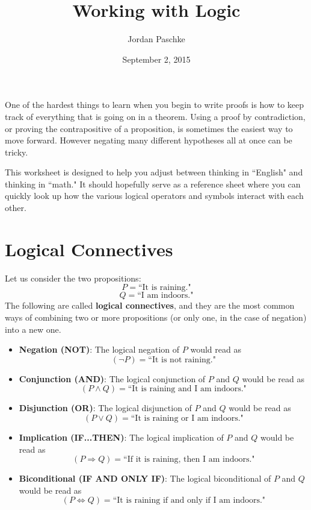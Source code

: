 \documentclass[12pt]{article}
\title{Working with Logic}
\author{Jordan Paschke}
\date{September 2, 2015}
\renewcommand{\_}[1]{\underline{ #1 }}
\theoremstyle{definition}
\numberwithin{equation}{subsection}
\begin{document}
\maketitle


One of the hardest things to learn when you begin to write proofs is how to keep track of everything that is going on in a theorem. Using a proof by contradiction, or proving the contrapositive of a proposition, is sometimes the easiest way to move forward. However negating many different hypotheses all at once can be tricky.

\bigskip

This worksheet is designed to help you adjust between thinking in ``English" and thinking in ``math." It should hopefully serve as a reference sheet where you can quickly look up how the various logical operators and symbols interact with each other.

\section*{Logical Connectives}

Let us consider the two propositions:
\[
P = \text{``It is raining."}
\]
\[
Q = \text{``I am indoors."}
\]
The following are called \textbf{logical connectives}, and they are the most common ways of combining two or more propositions (or only one, in the case of negation) into a new one.

\begin{itemize}

	\item \textbf{Negation (NOT)}: The logical negation of $P$ would read as
	\[
	    (\neg P) = \text{``It is not raining."}
	\]
	
	\item \textbf{Conjunction (AND)}: The logical conjunction of $P$ and $Q$ would be read as
	\[
	    (P \land Q) = \text{``It is raining and I am indoors."}
	\]
	
	\item \textbf{Disjunction (OR)}: The logical disjunction of $P$ and $Q$ would be read as
	\[
	    (P \lor Q) = \text{``It is raining or I am indoors."}
	\]
	
	\item \textbf{Implication (IF...THEN)}: The logical implication of $P$ and $Q$ would be read as
	\[
	  (P \Longrightarrow Q) = \text{``If it is raining, then I am indoors."}
	\]
	
	\item \textbf{Biconditional (IF AND ONLY IF)}: The logical biconditional of $P$ and $Q$ would be read as
	\[
	    (P \Longleftrightarrow Q) = \text{``It is raining if and only if I am indoors."}
	\]
\end{itemize}
\end{document}

